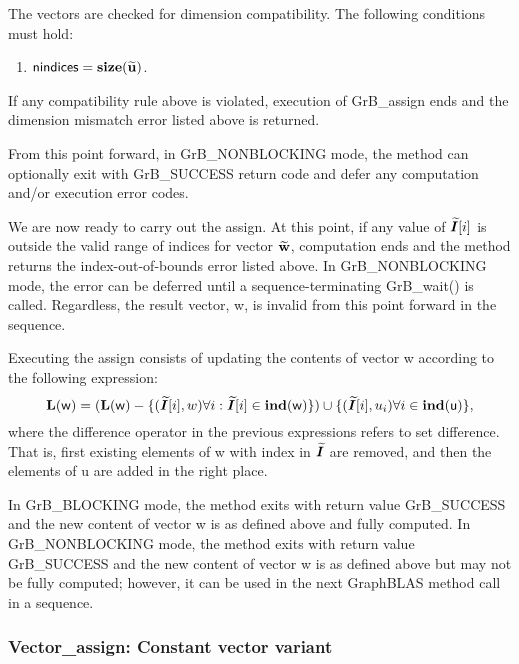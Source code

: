 The vectors are checked for dimension compatibility. 
The following conditions must hold:
\begin{enumerate}
    \item ${\sf nindices} = \bold{size}({\bf \widetilde{u}})$.
\end{enumerate}
If any compatibility rule above is violated, execution of {\sf GrB\_assign} ends and 
the dimension mismatch error listed above is returned.

From this point forward, in {\sf GrB\_NONBLOCKING} mode, the method can 
optionally exit with {\sf GrB\_SUCCESS} return code and defer any computation 
and/or execution error codes.

We are now ready to carry out the assign.
At this point, if any value of $\bm{\widetilde{I}}[i]$ is outside the valid 
range of indices for vector ${\bf \widetilde{w}}$, computation ends and the 
method returns the index-out-of-bounds error listed above. In 
{\sf GrB\_NONBLOCKING} mode, the error can be deferred until a 
sequence-terminating {\sf GrB\_wait()} is called.  Regardless, the result 
vector, {\sf w}, is invalid from this point forward in the 
sequence.

Executing the assign consists of updating the contents of vector {\sf w}
according to the following expression:
\[
	\bold{L}({\sf w}) = (\bold{L}({\sf w}) - \{(\bm{\widetilde{I}}[i],w) \forall i : \bm{\widetilde{I}}[i] \in \bold{ind}({\sf w})\})
	\cup \{(\bm{\widetilde{I}}[i],u_i) \forall i \in \bold{ind}({\sf u})\},
\]
where the difference operator in the previous expressions refers to set difference.
That is, first existing elements of {\sf w} with index in $\bm{\widetilde{I}}$ are removed,
and then the elements of {\sf u} are added in the right place.

In {\sf GrB\_BLOCKING} mode, the method exits with return value 
{\sf GrB\_SUCCESS} and the new content of vector {\sf w} is as defined above
and fully computed.  
In {\sf GrB\_NONBLOCKING} mode, the method exits with return value 
{\sf GrB\_SUCCESS} and the new content of vector {\sf w} is as defined above 
but may not be fully computed; however, it can be used in the next GraphBLAS 
method call in a sequence.


\subsubsection{{\sf Vector\_assign}: Constant vector variant}

